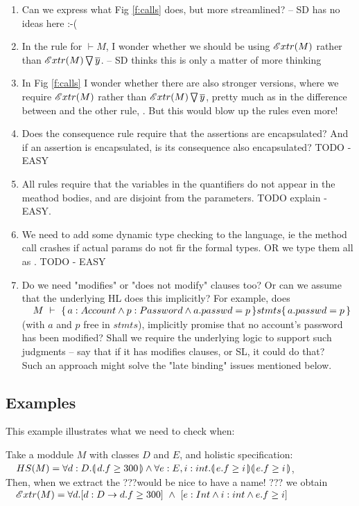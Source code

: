 \begin{enumerate}
\item 
Can we express what Fig \ref{f:calls} does, but more streamlined? -- SD has no ideas here  :-(
\item
In the rule for $\vdash M$,   I wonder whether we should be using ${\extract{M}}$ rather than $\PushAS {y} {\extract{M}}$. -- SD thinks this is only a matter of more thinking
\item
In  Fig \ref{f:calls} I wonder whether there are also stronger versions, where we require ${\extract{M}}$ rather than $\PushAS {y} {\extract{M}}$, pretty much as in the difference between {}  and the other rule, {}. But this would blow up the rules even more! 
\item
 Does the consequence rule require that the assertions are encapsulated? And if an assertion is encapsulated, is its consequence also encapsulated? TODO - EASY
\item
All rules require that the variables in the quantifiers do not appear in the meathod bodies, and are disjoint from the parameters.
TODO explain -EASY. 
\item  We need to add some dynamic type checking to the language, ie the method call crashes if actual params do not fir the formal types. OR we type them all as . TODO - EASY
\item
Do we need "modifies" or "does not modify" clauses too? Or can we assume that the underlying HL does this implicitly? For example, does\\
$\strut \ \ \  \hproves{M}  {a:Account \wedge p:Password \wedge a.passwd=p} {stmts}  {a.passwd=p}$\\ (with $a$ and $p$  free in $stmts$),  implicitly promise that no account's password has been modified? Shall we require the underlying logic to support such judgments -- say that if it has modifies clauses, or SL, it could do that?\\
Such an approach might solve the "late binding" issues mentioned below.
\end{enumerate}
 

\subsection{Examples}

This example illustrates what we need to check when:

Take a moddule $M$ with classes $D$ and $E$, and holistic specification:\\
$\strut \ \ \  HS(M)= \OneStateQ{d:D}{d.f\geq 300} \wedge  \TwoStatesQ{e:E,i:int}{e.f\geq i} {e.f\geq i} $,\\
Then, when we extract the ???would be nice to have a name! ??? we obtain\\
$\strut \ \ \   \extract{M}  = \forall d.[d:D \rightarrow d.f\geq 300]\ \wedge \  [ e:Int \wedge i:int \wedge e.f \geq i]$

